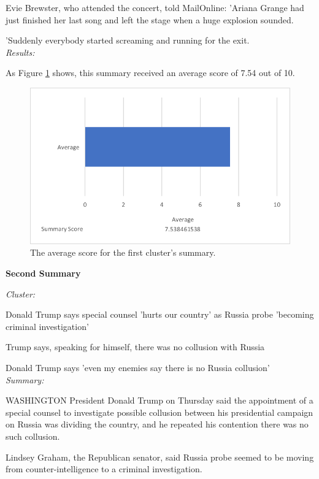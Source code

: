 \documentclass[12pt]{article}
\begin{document}
Evie Brewster, who attended the concert, told MailOnline: 'Ariana Grange had just finished her last song and left the stage when a huge explosion sounded.

'Suddenly everybody started screaming and running for the exit. \\

\emph{Results:}

As Figure \ref{summ1} shows, this summary received an average score of 7.54 out of 10. \\

\begin{figure}[ht!]
  \centering
    \includegraphics[scale=0.7]{summ1score.png}
   \caption[The average score for a summary]{The average score for the first cluster's summary.}
   \label{summ1}
\end{figure} 

\textbf{Second Summary}

\emph{Cluster:}

Donald Trump says special counsel 'hurts our country' as Russia probe 'becoming criminal investigation'

Trump says, speaking for himself, there was no collusion with Russia

Donald Trump says 'even my enemies say there is no Russia collusion' \\

\emph{Summary:}

WASHINGTON President Donald Trump on Thursday said the appointment of a special counsel to investigate possible collusion between his presidential campaign on Russia was dividing the country, and he repeated his contention there was no such collusion.

Lindsey Graham, the Republican senator, said Russia probe seemed to be moving from counter-intelligence to a criminal investigation.
\end{document}
